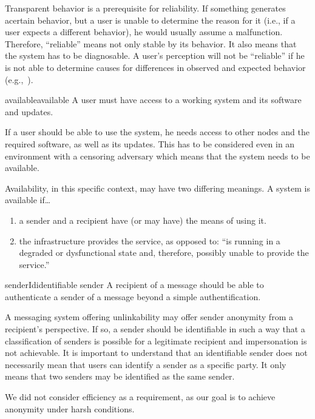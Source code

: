 Transparent behavior is a prerequisite for reliability. If something generates acertain behavior, but a user is unable to determine the reason for it (i.e., if a user expects a different behavior), he would usually assume a malfunction. Therefore, ``reliable'' means not only stable by its behavior. It also means that the system has to be diagnosable. A user's perception will not be ``reliable'' if he is not able to determine causes for differences in observed and expected behavior (e.g.,~\cite{nicholson2003assessing}).

\begin{requirement}{available}{available}
	A user must have access to a working system and its software and updates.
\end{requirement}

If a user should be able to use the system, he needs access to other nodes and the required software, as well as its updates. This has to be considered even in an environment with a censoring adversary which means that the system needs to be available.

Availability, in this specific context, may have two differing meanings. A system is available if\ldots
\begin{enumerate}
	\item a sender and a recipient have (or may have) the means of using it.
	\item the infrastructure provides the service, as opposed to: ``is running in a degraded or dysfunctional state and, therefore, possibly unable to provide the service.''
\end{enumerate}

\begin{requirement}{senderId}{identifiable sender}
	A recipient of a message should be able to authenticate a sender of a message beyond a simple authentification.
\end{requirement}

A messaging system offering unlinkability may offer sender anonymity from a recipient's perspective. If so, a sender should be identifiable in such a way that a classification of senders is possible for a legitimate recipient and impersonation is not achievable. It is important to understand that an identifiable sender does not necessarily mean that users can identify a sender as a specific party. It only means that two senders may be identified as the same sender.

We did not consider efficiency as a requirement, as our goal is to achieve anonymity under harsh conditions. 

